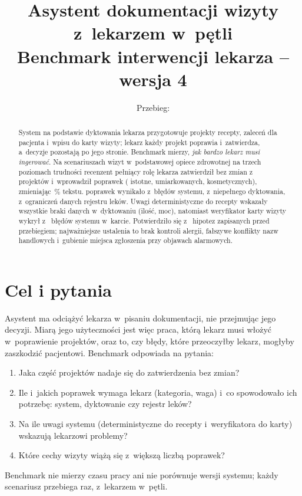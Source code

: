 \documentclass[11pt,a4paper]{article}
\title{Asystent dokumentacji wizyty z~lekarzem w~pętli\\[0.3em]
       \large Benchmark interwencji lekarza -- wersja 4}
\author{}
\date{Przebieg: \runDate}
\begin{document}
\maketitle

\begin{abstract}
System na podstawie dyktowania lekarza przygotowuje projekty recepty, zaleceń dla pacjenta i~wpisu do karty wizyty;
lekarz każdy projekt poprawia i~zatwierdza, a~decyzje pozostają po jego stronie. Benchmark mierzy, \emph{jak bardzo lekarz musi ingerować}.
Na \nVisits{} scenariuszach wizyt w~podstawowej opiece zdrowotnej na trzech poziomach trudności recenzent pełniący rolę lekarza
zatwierdził bez zmian \nDraftsUnchanged{} z~\nDrafts{} projektów i~wprowadził \nCorrections{} poprawek
(\nSevSignificant{} istotne, \nSevModerate{} umiarkowanych, \nSevCosmetic{} kosmetycznych), zmieniając \pCharsEdited\,\% tekstu.
\nSrcSystem{} poprawek wynikało z~błędów systemu, \nSrcDictation{} z~niepełnego dyktowania, \nSrcRegistry{} z~ograniczeń danych rejestru leków.
Uwagi deterministyczne do recepty wskazały wszystkie braki danych w~dyktowaniu (ilość, moc), natomiast weryfikator karty wizyty wykrył
\nStageTwoSystemByVerifier{} z~\nStageTwoSystem{} błędów systemu w~karcie. Potwierdziło się \nHypothesesConfirmed{} z~\nHypotheses{}
hipotez zapisanych przed przebiegiem; najważniejsze ustalenia to brak kontroli alergii, fałszywe konflikty nazw handlowych
i~gubienie miejsca zgłoszenia przy objawach alarmowych.
\end{abstract}

\tableofcontents

\section{Cel i pytania}

Asystent ma odciążyć lekarza w~pisaniu dokumentacji, nie przejmując jego decyzji. Miarą jego użyteczności jest więc
praca, którą lekarz musi włożyć w~poprawienie projektów, oraz to, czy błędy, które przeoczyłby lekarz, mogłyby zaszkodzić pacjentowi.
Benchmark odpowiada na pytania:
\begin{enumerate}[label=P\arabic*.]
  \item Jaka część projektów nadaje się do zatwierdzenia bez zmian?
  \item Ile i~jakich poprawek wymaga lekarz (kategoria, waga) i~co spowodowało ich potrzebę: system, dyktowanie czy rejestr leków?
  \item Na ile uwagi systemu (deterministyczne do recepty i~weryfikatora do karty) wskazują lekarzowi problemy?
  \item Które cechy wizyty wiążą się z~większą liczbą poprawek?
\end{enumerate}
Benchmark nie mierzy czasu pracy ani nie porównuje wersji systemu; każdy scenariusz przebiega raz, z~lekarzem w~pętli.
\end{document}

